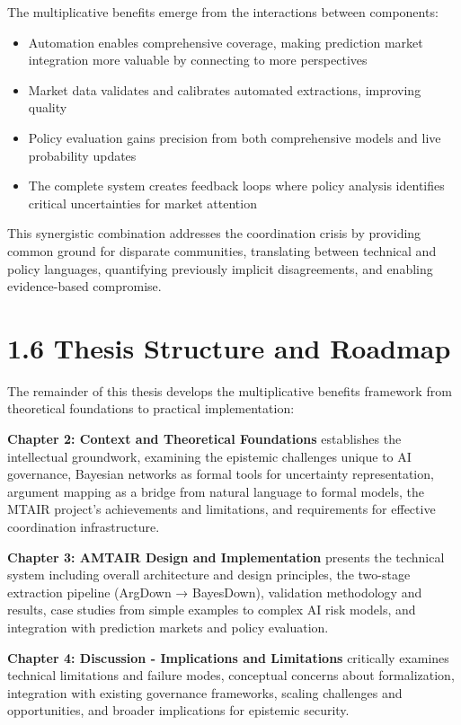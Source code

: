 \documentclass[
  11pt,
  letterpaper,
]{book}
\providecommand{\tightlist}{%
  \setlength{\itemsep}{0pt}\setlength{\parskip}{0pt}}
\begin{document}
The multiplicative benefits emerge from the interactions between
components:

\begin{itemize}
\tightlist
\item
  Automation enables comprehensive coverage, making prediction market
  integration more valuable by connecting to more perspectives
\item
  Market data validates and calibrates automated extractions, improving
  quality
\item
  Policy evaluation gains precision from both comprehensive models and
  live probability updates
\item
  The complete system creates feedback loops where policy analysis
  identifies critical uncertainties for market attention
\end{itemize}

This synergistic combination addresses the coordination crisis by
providing common ground for disparate communities, translating between
technical and policy languages, quantifying previously implicit
disagreements, and enabling evidence-based compromise.

\section{1.6 Thesis Structure and
Roadmap}\label{thesis-structure-and-roadmap}

The remainder of this thesis develops the multiplicative benefits
framework from theoretical foundations to practical implementation:

\textbf{Chapter 2: Context and Theoretical Foundations} establishes the
intellectual groundwork, examining the epistemic challenges unique to AI
governance, Bayesian networks as formal tools for uncertainty
representation, argument mapping as a bridge from natural language to
formal models, the MTAIR project's achievements and limitations, and
requirements for effective coordination infrastructure.

\textbf{Chapter 3: AMTAIR Design and Implementation} presents the
technical system including overall architecture and design principles,
the two-stage extraction pipeline (ArgDown → BayesDown), validation
methodology and results, case studies from simple examples to complex AI
risk models, and integration with prediction markets and policy
evaluation.

\textbf{Chapter 4: Discussion - Implications and Limitations} critically
examines technical limitations and failure modes, conceptual concerns
about formalization, integration with existing governance frameworks,
scaling challenges and opportunities, and broader implications for
epistemic security.
\end{document}
